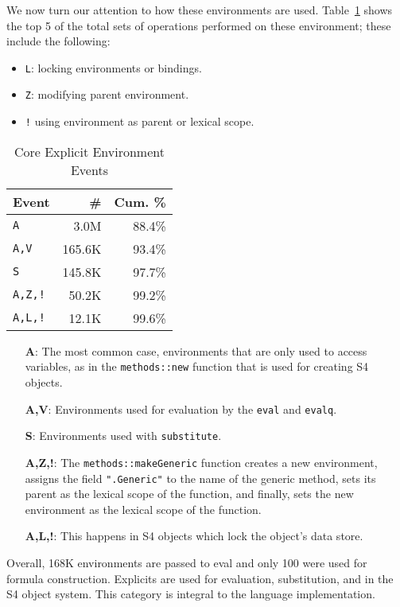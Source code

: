 \documentclass[10pt,review,sigplan,authorversion=true]{acmart}
\renewcommand{\c}[1]{\lstinline |#1|\xspace}
\begin{document}
\noindent
We now turn our attention to how these environments are used.
Table~\ref{table:core_explicit_env_seq} shows the top 5 of the total
sets of operations performed on these environment; these include the
following:
\begin{itemize}
\item \texttt{L}: locking environments or bindings.
\item \texttt{Z}: modifying parent environment.
\item \texttt{!} using environment as parent or lexical scope.
\end{itemize}

\begin{table}[!h]
  \small
  \caption{Core Explicit Environment Events} \label{table:core_explicit_env_seq}
  \centering
  \begin{tabular}{lrr}
    \toprule
    \textbf{Event}&\textbf{\#}&\textbf{Cum. \%}\\
    \midrule
    \texttt{A}&3.0M&88.4\%\\
    \texttt{A,V}&165.6K&93.4\%\\
    \texttt{S}&145.8K&97.7\%\\
    \texttt{A,Z,!}&50.2K&99.2\%\\
    \texttt{A,L,!}&12.1K&99.6\%\\
    \bottomrule
  \end{tabular}
\end{table}

\begin{itemize}
\item[{\bf A}:] The most common case, environments that are only used to access
  variables, as in the \c{methods::new} function that is used for creating S4
  objects.
\item[{\bf A,V}:] Environments used for evaluation by the \c{eval} and
  \c{evalq}.
\item[{\bf S}:] Environments used with \c{substitute}.
\item[{\bf A,Z,!}:] The \c{methods::makeGeneric} function creates a new
  environment, assigns the field \c{".Generic"} to the name of the generic
  method, sets its parent as the lexical scope of the function, and finally,
  sets the new environment as the lexical scope of the function.
\item[{\bf A,L,!}:] This happens in S4 objects which lock the object's data
  store.
\end{itemize}

\noindent
Overall, 168K environments are passed to eval and only 100 were used for formula
construction. Explicits are used for evaluation, substitution, and in the S4
object system. This category is integral to the language implementation.
\end{document}
